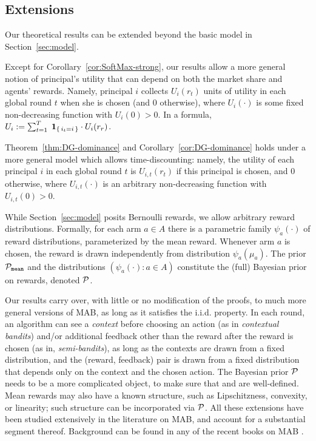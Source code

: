 \subsection{Extensions}
\label{sec:theory-extensions}

Our theoretical results can be extended beyond the basic model in Section~\ref{sec:model}.


Except for Corollary~\ref{cor:SoftMax-strong}, our results allow a more general notion of principal's utility that can depend on both the market share and agents' rewards. Namely, principal $i$ collects $U_i(r_t)$ units of utility in each global round $t$ when she is chosen (and $0$ otherwise), where $U_i(\cdot)$ is some fixed non-decreasing function with $U_i(0)>0$. In a formula,
$U_i := \sum_{t=1}^T\; {\bf 1}_{\left\{\,i_t=i\,\right\}}\cdot U_i(r_r)$.

Theorem~\ref{thm:DG-dominance} and Corollary~\ref{cor:DG-dominance} holds under a more general model which allows time-discounting: namely, the utility of each principal $i$ in each global round $t$ is $U_{i,t}(r_t)$ if this principal is chosen, and $0$ otherwise, where $U_{i,t}(\cdot)$ is an arbitrary non-decreasing function with $U_{i,t}(0)>0$.

While Section~\ref{sec:model} posits Bernoulli rewards, we allow arbitrary reward distributions. Formally, for each arm $a\in A$ there is a parametric family $\psi_a(\cdot)$ of reward distributions, parameterized by the mean reward. Whenever arm $a$ is chosen, the reward is drawn independently from distribution $\psi_a(\mu_a)$. The prior $\mathcal{P}_\mathtt{mean}$ and the distributions $(\psi_a(\cdot)\colon a\in A)$ constitute the (full) Bayesian prior on rewards, denoted $\mathcal{P}$.

 Our results carry over, with little or no modification of the proofs, to much more general versions of MAB, as long as it satisfies the i.i.d. property. In each round, an algorithm can see a \emph{context} before choosing an action (as in \emph{contextual bandits}) and/or additional feedback other than the reward after the reward is chosen (as in, \eg \emph{semi-bandits}), as long as the contexts are drawn from a fixed distribution, and the (reward, feedback) pair is drawn from a fixed distribution that depends only on the context and the chosen action. The Bayesian prior $\mathcal{P}$ needs to be a more complicated object, to make sure that \PMR and \BIR are well-defined. Mean rewards may also have a known structure, such as Lipschitzness, convexity, or linearity; such structure can be incorporated via $\mathcal{P}$. All these extensions have been studied extensively in the literature on MAB, and account for a substantial segment thereof. Background can be found in any of the recent books on MAB \citep{Bubeck-survey12,slivkins-MABbook,LS19bandit-book}.



